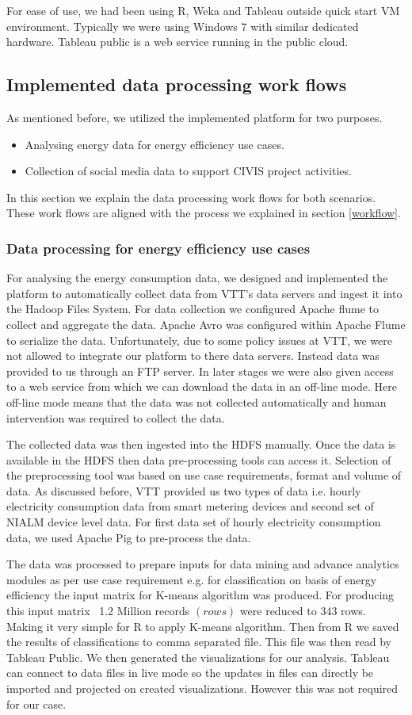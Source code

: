For ease of use, we had been using R, Weka and Tableau outside quick start VM environment. Typically we were using Windows 7 with similar dedicated hardware. Tableau public is a web service running in the public cloud.
\subsection{Implemented data processing work flows } 
As mentioned before, we utilized the implemented platform for two purposes.
\begin{itemize}
\item Analysing energy data for energy efficiency use cases.
\item Collection of social media data to support CIVIS project activities. 
\end{itemize}
In this section we explain the data processing work flows for both scenarios. These work flows are aligned with the process we explained in section \ref{workflow}. 
\subsubsection{Data processing for energy efficiency use cases}
For analysing the energy consumption data, we designed and implemented the platform to automatically collect data from VTT's data servers and ingest it into the Hadoop Files System. For data collection we configured Apache flume to collect and aggregate the data. Apache Avro was configured within Apache Flume to serialize the data. Unfortunately, due to some policy issues at VTT, we were not allowed to integrate our platform to there data servers. Instead data was provided to us through an FTP server. In later stages we were also given access to a web service from which we can download the data in an off-line mode. Here off-line mode means that the data was not collected automatically and human intervention was required to collect the data.

The collected data was then ingested into the HDFS manually. Once the data is available in the HDFS then data pre-processing tools can access it. Selection of the preprocessing tool was based on use case requirements, format and volume of data. As discussed before, VTT provided us two types of data i.e. hourly electricity consumption data from smart metering devices and second set of NIALM device level data. For first data set of hourly electricity consumption data, we used Apache Pig to pre-process the data. 

 The data was processed to prepare inputs for data mining and advance analytics modules as per use case requirement e.g. for classification on basis of energy efficiency the input matrix for K-means algorithm was produced. For producing this input matrix ~1.2 Million records \((rows)\) were reduced to 343 rows. Making it very simple for R to apply K-means algorithm. Then from R we saved the results of classifications to comma separated file. This file was then read by Tableau Public. We then generated the visualizations for our analysis. Tableau can connect to data files in live mode so the updates in files can directly be imported and projected on created visualizations. However this was not required for our case.
 
